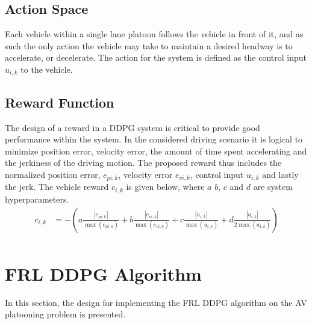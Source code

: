 \subsection{Action Space}
Each vehicle within a single lane platoon follows the vehicle in front of it, and as
such the only action the vehicle may take to maintain a desired headway is to accelerate,
or decelerate. The action for the system is defined as the control input $u_{i,k}$ to the
vehicle.

\subsection{Reward Function}
The design of a reward in a DDPG system is critical to provide good performance within
the system.  In the considered driving scenario it is logical to minimize position error,
velocity error, the amount of time spent accelerating and the jerkiness of the driving
motion.  The proposed reward thus includes the normalized position error, $e_{pi,k}$,
velocity error $e_{vi,k}$, control input $u_{i,k}$ and lastly the jerk. The vehicle
reward $c_{i,k}$ is given below, where $a$ $b$, $c$ and $d$ are system hyperparameters.
\begin{equation} \label{eqn:rewardB}
\begin{aligned}
    c_{i,k} &= -\left(a\frac{|e_{pi,k}|}{\max(e_{pi,k})} + b\frac{|e_{vi,k}|}{\max(e_{vi,k})} + c\frac{|u_{i,k}|}{\max(u_{i,k})} +  d\frac{\dot{|a_{i,k}|}}{2\max(a_{i,k})}\right) \\
\end{aligned}
\end{equation}

\section{FRL DDPG Algorithm}
In this section, the design for implementing the FRL DDPG algorithm on the AV platooning
problem is presented.
